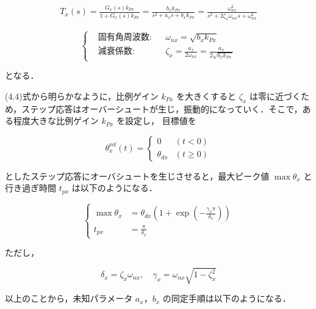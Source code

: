 \begin{align}
    T_x(s) = \frac{G_x(s)k_{Px}}{1 + G_x(s)k_{Px}} = \frac{b_x k_{Px}}{s^2 + a_x s + b_x k_{Px}} = \frac{\omega_{nx}^2}{s^2 + 2 \zeta_x \omega_{nx} s + \omega_{nx}^2} \tag{4.3}
\end{align}

\[
\left\{
\begin{aligned}
    &\text{固有角周波数:} && \omega_{nx} = \sqrt{b_x k_{Px}} \\
    &\text{減衰係数:} && \zeta_x = \frac{a_x}{2 \omega_{nx}} = \frac{a_x}{2\sqrt{b_x k_{Px}}}
\end{aligned}
\right. \tag{4.4}
\]

となる．

(4.4)式から明らかなように，比例ゲイン $k_{Px}$ を大きくすると $\zeta_x$ は零に近づくため，ステップ応答はオーバーシュートが生じ，振動的になっていく．そこで，ある程度大きな比例ゲイン $k_{Px}$ を設定し，
目標値を

\begin{equation}
    \theta_x^{\mathrm{ref}}(t) = 
    \begin{cases}
        0 & (t < 0) \\
        \theta_{dx} & (t \geq 0)
    \end{cases} \tag{4.5}
\end{equation}

としたステップ応答にオーバシュートを生じさせると，最大ピーク値 $\max \theta_x$ と行き過ぎ時間 $t_{px}$ は以下のようになる．

\begin{equation}
    \left\{
    \begin{aligned}
        \max \theta_x &= \theta_{dx} \left(1 + \exp\left(-\frac{\gamma_x \pi}{\delta_x} \right) \right) \\
        t_{px} &= \frac{\pi}{\delta_x}
    \end{aligned}
    \right. \tag{4.6}
\end{equation}


ただし，

\begin{equation}
    \delta_x = \zeta_x \omega_{nx}, \quad \gamma_x = \omega_{nx} \sqrt{1 - \zeta_x^2} \tag{4.7}
\end{equation}

以上のことから，未知パラメータ $a_x$，$b_x$ の同定手順は以下のようになる．

